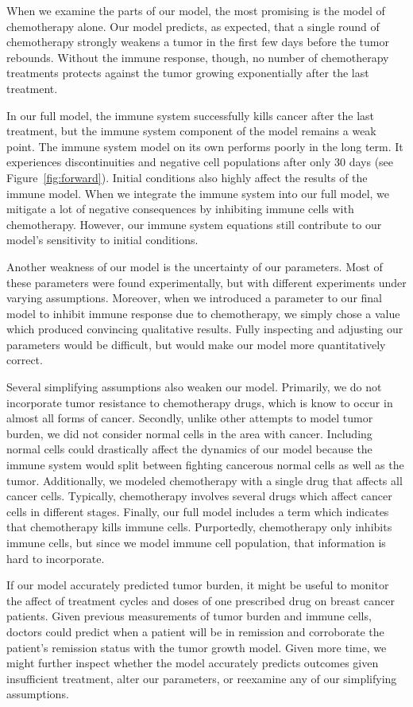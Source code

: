 \documentclass[11pt]{amsart}
\begin{document}
When we examine the parts of our model, the most promising is the model of chemotherapy alone. 
Our model predicts, as expected, that a single round of chemotherapy strongly weakens a tumor in the first few days before the tumor rebounds. 
Without the immune response, though, no number of chemotherapy treatments protects against the tumor growing exponentially after the last treatment.

In our full model, the immune system successfully kills cancer after the last treatment, but the immune system component of the model remains a weak point. 
The immune system model on its own performs poorly in the long term.
It experiences discontinuities and negative cell populations after only 30 days (see Figure~\ref{fig:forward}).
Initial conditions also highly affect the results of the immune model.
When we integrate the immune system into our full model, we mitigate a lot of negative consequences by inhibiting immune cells with chemotherapy.
However, our immune system equations still contribute to our model's sensitivity to initial conditions.

Another weakness of our model is the uncertainty of our parameters.
Most of these parameters were found experimentally, but with different experiments under varying assumptions.
Moreover, when we introduced a parameter to our final model to inhibit immune response due to chemotherapy, we simply chose a value which produced convincing qualitative results.
Fully inspecting and adjusting our parameters would be difficult, but would make our model more quantitatively correct.

Several simplifying assumptions also weaken our model. 
Primarily, we do not incorporate tumor resistance to chemotherapy drugs, which is know to occur in almost all forms of cancer.
Secondly, unlike other attempts to model tumor burden, we did not consider normal cells in the area with cancer.
Including normal cells could drastically affect the dynamics of our model because the immune system would split between fighting cancerous normal cells as well as the tumor.
Additionally, we modeled chemotherapy with a single drug that affects all cancer cells.
Typically, chemotherapy involves several drugs which affect cancer cells in different stages.
Finally, our full model includes a term which indicates that chemotherapy kills immune cells.
Purportedly, chemotherapy only inhibits immune cells, but since we model immune cell population, that information is hard to incorporate.

If our model accurately predicted tumor burden, it might be useful to monitor the affect of treatment cycles and doses of one prescribed drug on breast cancer patients. 
Given previous measurements of tumor burden and immune cells, doctors could predict when a patient will be in remission and corroborate the patient's remission status with the tumor growth model. 
Given more time, we might further inspect whether the model accurately predicts outcomes given insufficient treatment, alter our parameters, or reexamine any of our simplifying assumptions.
\end{document}
